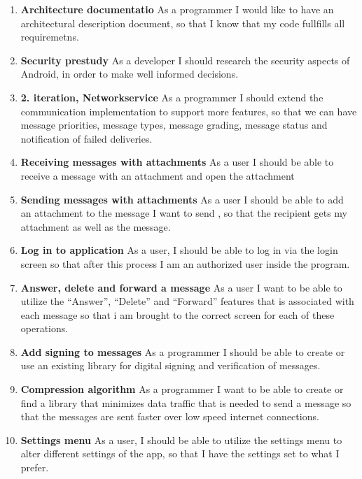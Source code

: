 \begin{enumerate}
			\item {\bf Architecture documentatio} As a programmer I would like to have an architectural description document, so that I know that my code fullfills all requiremetns.
			\item {\bf Security prestudy} As a developer I should research the security aspects of Android, in order to make well informed decisions.
			\item {\bf 2. iteration, Networkservice} As a programmer I should extend the communication implementation to support more features, so that we can have message priorities, message types, message grading, message status and notification of failed deliveries.
			\item {\bf Receiving messages with attachments} As a user I should be able to receive a message with an attachment and open the attachment
			\item {\bf Sending messages with attachments} As a user I should be able to add an attachment to the message I want to send , so that the recipient gets my attachment as well as the message.
			\item {\bf Log in to application} As a user, I should be able to log in via the login screen so that after this process I am an authorized user inside the program.
			\item {\bf Answer, delete and forward a message} As a user I want to be able to utilize the ``Answer'', ``Delete'' and ``Forward'' features that is associated with each message so that i am brought to the correct screen for each of these operations.
			\item {\bf Add signing to messages} As a programmer I should be able to create or use an existing library for digital signing and verification of messages.
			\item {\bf Compression algorithm} As a programmer I want to be able to create or find a library that minimizes data traffic that is needed to send a message so that the messages are sent faster over low speed internet connections.
			\item {\bf Settings menu} As a user, I should be able to utilize the settings menu to alter different settings of the app, so that I have the settings set to what I prefer.
			
			
			

\end{enumerate}
